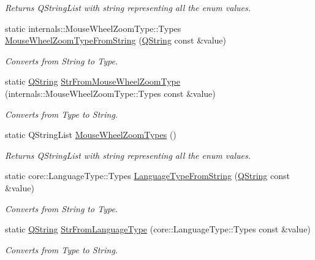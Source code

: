 \begin{DoxyCompactItemize}
\begin{DoxyCompactList}\small\item\em \-Returns \-Q\-String\-List with string representing all the enum values. \end{DoxyCompactList}\item 
static \*
internals\-::\-Mouse\-Wheel\-Zoom\-Type\-::\-Types \hyperlink{group___o_p_map_widget_gab829c562d2443c5ffbe2c7d4b7071712}{\-Mouse\-Wheel\-Zoom\-Type\-From\-String} (\hyperlink{group___u_a_v_objects_plugin_gab9d252f49c333c94a72f97ce3105a32d}{\-Q\-String} const \&value)
\begin{DoxyCompactList}\small\item\em \-Converts from \-String to \-Type. \end{DoxyCompactList}\item 
static \hyperlink{group___u_a_v_objects_plugin_gab9d252f49c333c94a72f97ce3105a32d}{\-Q\-String} \hyperlink{group___o_p_map_widget_ga66a0a97a25bc6f0c8e79a87e466a04b2}{\-Str\-From\-Mouse\-Wheel\-Zoom\-Type} (internals\-::\-Mouse\-Wheel\-Zoom\-Type\-::\-Types const \&value)
\begin{DoxyCompactList}\small\item\em \-Converts from \-Type to \-String. \end{DoxyCompactList}\item 
static \-Q\-String\-List \hyperlink{group___o_p_map_widget_ga445f36c5148af8c77ebdf64269134267}{\-Mouse\-Wheel\-Zoom\-Types} ()
\begin{DoxyCompactList}\small\item\em \-Returns \-Q\-String\-List with string representing all the enum values. \end{DoxyCompactList}\item 
static core\-::\-Language\-Type\-::\-Types \hyperlink{group___o_p_map_widget_ga1a7989d295311b564112f0adc0e9158d}{\-Language\-Type\-From\-String} (\hyperlink{group___u_a_v_objects_plugin_gab9d252f49c333c94a72f97ce3105a32d}{\-Q\-String} const \&value)
\begin{DoxyCompactList}\small\item\em \-Converts from \-String to \-Type. \end{DoxyCompactList}\item 
static \hyperlink{group___u_a_v_objects_plugin_gab9d252f49c333c94a72f97ce3105a32d}{\-Q\-String} \hyperlink{group___o_p_map_widget_gaeb691bec877a44aa5e4270efaa965c2a}{\-Str\-From\-Language\-Type} (core\-::\-Language\-Type\-::\-Types const \&value)
\begin{DoxyCompactList}\small\item\em \-Converts from \-Type to \-String. \end{DoxyCompactList}\item 

\end{DoxyCompactItemize}
